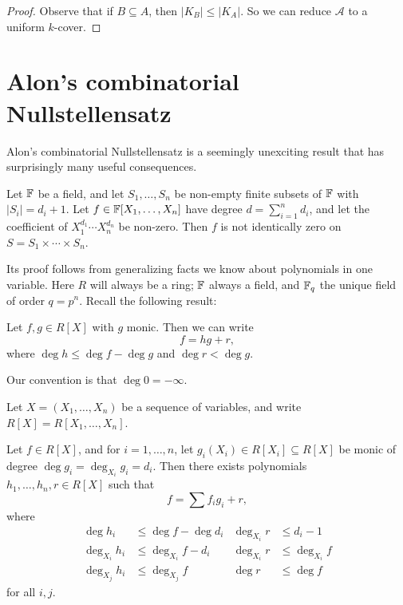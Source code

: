 \documentclass[a4paper]{article}
\begin{document}
\begin{proof}
  Observe that if $B \subseteq A$, then $|K_B| \leq |K_A|$. So we can reduce $\mathcal{A}$ to a uniform $k$-cover.
\end{proof}
%

\section{Alon's combinatorial Nullstellensatz}
Alon's combinatorial Nullstellensatz is a seemingly unexciting result that has surprisingly many useful consequences.
\begin{thm}
  Let $\mathbb{F}$ be a field, and let $S_1, \ldots, S_n$ be non-empty finite subsets of $\mathbb{F}$ with $|S_i| = d_i + 1$. Let $f \in \mathbb{F}[X_1, \ldots, X_n]$ have degree $d = \sum_{i = 1}^n d_i$, and let the coefficient of $X_1^{d_1} \cdots X_n^{d_n}$ be non-zero. Then $f$ is not identically zero on $S = S_1 \times \cdots \times S_n$.
\end{thm}

Its proof follows from generalizing facts we know about polynomials in one variable. Here $R$ will always be a ring; $\mathbb{F}$ always a field, and $\mathbb{F}_q$ the unique field of order $q = p^n$. Recall the following result:
\begin{prop}
  Let $f, g \in R[X]$ with $g$ monic. Then we can write
  \[
    f = hg + r,
  \]
  where $\deg h \leq \deg f - \deg g$ and $\deg r < \deg g$.
\end{prop}
Our convention is that $\deg 0 = -\infty$.

Let $X = (X_1, \ldots, X_n)$ be a sequence of variables, and write $R[X] = R[X_1, \ldots, X_n]$.

\begin{lemma}
  Let $f \in R[X]$, and for $i = 1, \ldots, n$, let $g_i(X_i) \in R[X_i] \subseteq R[X]$ be monic of degree $\deg g_i = \deg_{X_i} g_i = d_i$. Then there exists polynomials $h_1, \ldots, h_n, r \in R[X]$ such that
  \[
    f = \sum f_i g_i + r,
  \]
  where
  \begin{align*}
    \deg h_i &\leq \deg f - \deg d_i & \deg_{X_i} r &\leq d_i - 1\\
    \deg_{X_i} h_i &\leq \deg_{X_i} f - d_i & \deg_{X_i} r &\leq \deg_{X_i} f\\
    \deg_{X_j} h_i &\leq \deg_{X_j} f & \deg r &\leq \deg f
  \end{align*}
  for all $i, j$.
\end{lemma}
\end{document}
